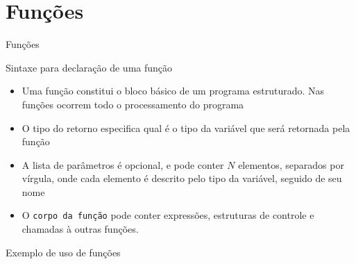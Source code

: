 \section{Funções}

\begin{frame}[fragile]{Funções}

    \begin{block}{Sintaxe para declaração de uma função}
    \end{block}
	\begin{itemize}
		\item Uma função constitui o bloco básico de um programa estruturado. Nas funções ocorrem 
        todo o processamento do programa

		\item O tipo do retorno especifica qual é o tipo da variável que será retornada pela 
        função

		\item A lista de parâmetros é opcional, e pode conter $N$ elementos, separados por vírgula,         onde cada elemento é descrito pelo tipo da variável, seguido de seu nome
		
		\item O {\tt corpo da função} pode conter expressões, estruturas de controle e chamadas à 
        outras funções.
	\end{itemize}

\end{frame}

\begin{frame}[fragile]{Exemplo de uso de funções}
\end{frame}
